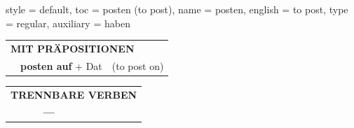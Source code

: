 \begin{verbentry}{
  style = {default},
  toc = {posten (to post)},
  name = {posten},
  english = {to post},
  type = {regular},
  auxiliary = {haben}
}
\vspace{10pt}

\begin{tabular}{lll}
\multicolumn{3}{l}{\textbf{MIT PRÄPOSITIONEN}}\\
& \textbf{posten auf} + Dat & (to post on)\\
\end{tabular}
\hfill
\begin{tabular}{lll}
\multicolumn{3}{l}{\textbf{TRENNBARE VERBEN}}\\
& \textbf{---} & \\
\end{tabular}

\vspace{-5pt}
\end{verbentry}

